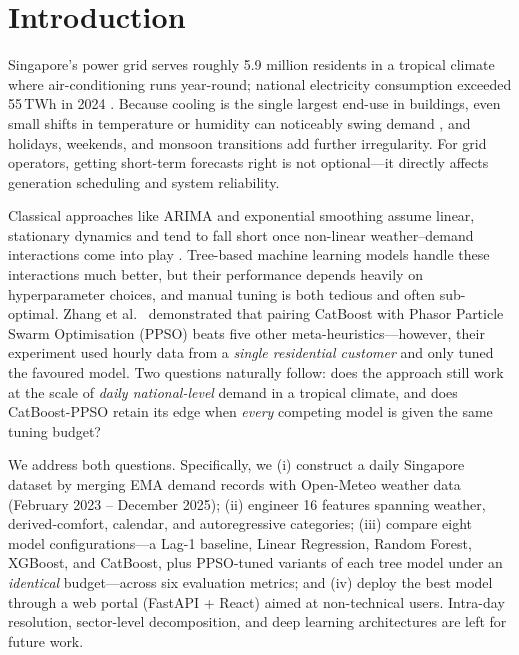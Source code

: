 \section{Introduction}\label{sec:intro}
 \setcounter{page}{1}

Singapore's power grid serves roughly 5.9 million residents in a tropical climate where air-conditioning runs year-round; national electricity consumption exceeded 55\,TWh in 2024 \parencite{ema2025statistics}. Because cooling is the single largest end-use in buildings, even small shifts in temperature or humidity can noticeably swing demand \parencite{zhao2012review}, and holidays, weekends, and monsoon transitions add further irregularity. For grid operators, getting short-term forecasts right is not optional---it directly affects generation scheduling and system reliability.

Classical approaches like ARIMA and exponential smoothing assume linear, stationary dynamics and tend to fall short once non-linear weather--demand interactions come into play \parencite{almusaylh2018forecasting}. Tree-based machine learning models handle these interactions much better, but their performance depends heavily on hyperparameter choices, and manual tuning is both tedious and often sub-optimal. Zhang et al.\ \parencite{zhang2023catboostppso} demonstrated that pairing CatBoost with Phasor Particle Swarm Optimisation (PPSO) beats five other meta-heuristics---however, their experiment used hourly data from a \emph{single residential customer} and only tuned the favoured model. Two questions naturally follow: does the approach still work at the scale of \emph{daily national-level} demand in a tropical climate, and does CatBoost-PPSO retain its edge when \emph{every} competing model is given the same tuning budget?

We address both questions. Specifically, we (i) construct a daily Singapore dataset by merging EMA demand records with Open-Meteo weather data (February 2023 -- December 2025); (ii) engineer 16 features spanning weather, derived-comfort, calendar, and autoregressive categories; (iii) compare eight model configurations---a Lag-1 baseline, Linear Regression, Random Forest, XGBoost, and CatBoost, plus PPSO-tuned variants of each tree model under an \emph{identical} budget---across six evaluation metrics; and (iv) deploy the best model through a web portal (FastAPI + React) aimed at non-technical users. Intra-day resolution, sector-level decomposition, and deep learning architectures are left for future work.

